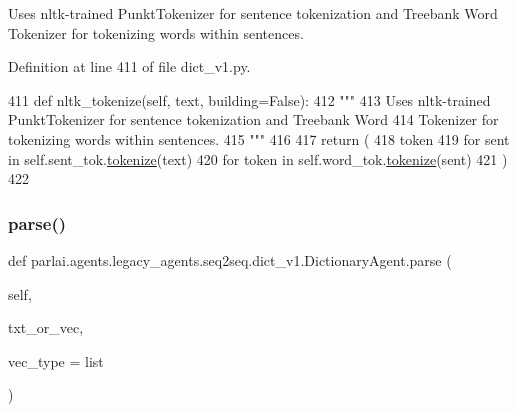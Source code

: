 \begin{DoxyVerb}Uses nltk-trained PunktTokenizer for sentence tokenization and Treebank Word
Tokenizer for tokenizing words within sentences.
\end{DoxyVerb}
 

Definition at line 411 of file dict\+\_\+v1.\+py.


\begin{DoxyCode}
411     \textcolor{keyword}{def }nltk\_tokenize(self, text, building=False):
412         \textcolor{stringliteral}{"""}
413 \textcolor{stringliteral}{        Uses nltk-trained PunktTokenizer for sentence tokenization and Treebank Word}
414 \textcolor{stringliteral}{        Tokenizer for tokenizing words within sentences.}
415 \textcolor{stringliteral}{        """}
416 
417         \textcolor{keywordflow}{return} (
418             token
419             \textcolor{keywordflow}{for} sent \textcolor{keywordflow}{in} self.sent\_tok.\hyperlink{namespaceparlai_1_1agents_1_1tfidf__retriever_1_1build__tfidf_a1fdb457e98eb4e4c26047e229686a616}{tokenize}(text)
420             \textcolor{keywordflow}{for} token \textcolor{keywordflow}{in} self.word\_tok.\hyperlink{namespaceparlai_1_1agents_1_1tfidf__retriever_1_1build__tfidf_a1fdb457e98eb4e4c26047e229686a616}{tokenize}(sent)
421         )
422 
\end{DoxyCode}
\mbox{\label{classparlai_1_1agents_1_1legacy__agents_1_1seq2seq_1_1dict__v1_1_1DictionaryAgent_acae89a6d1049de6fd2cab06c7804dcdd}} 
\subsubsection{\texorpdfstring{parse()}{parse()}}
{\footnotesize\ttfamily def parlai.\+agents.\+legacy\+\_\+agents.\+seq2seq.\+dict\+\_\+v1.\+Dictionary\+Agent.\+parse (\begin{DoxyParamCaption}\item[{}]{self,  }\item[{}]{txt\+\_\+or\+\_\+vec,  }\item[{}]{vec\+\_\+type = {\ttfamily list} }\end{DoxyParamCaption})}

